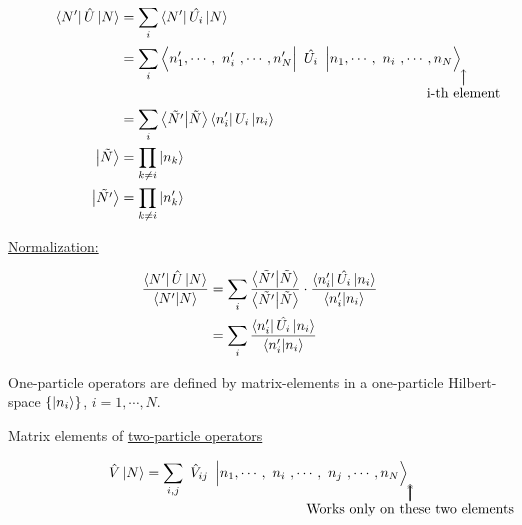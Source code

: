 \begin{align}
	\bra{N'} \hat{U}\ket{N} &= \sum_i  \bra{N'} \hat{U_i}\ket{N} \nonumber \\
	&= \sum_i \bra{n'_1, \cdots, \tikzmark{node1}{n'_i}, \cdots, n'_N}\tikzmark{node2}{\hat{U_i}} \ket{n_1, \cdots, \tikzmark{node3}{n_i},\cdots, n_N} \nonumber
	\begin{tikzpicture}[overlay, remember picture,node distance =1.5cm]
		\draw[->,black] (node2) .. controls +(down:1.2cm) and +(right:0cm) .. node[below] {i-th element} (node3.south);
	\end{tikzpicture}\\
	\nonumber \\
	&= \sum_i \bra{\tilde{N'}}\ket{\tilde{N}} \bra{n'_i} U_i \ket{n_i}\\
	\ket{\tilde{N}} &= \prod_{k \neq i} \ket{n_k} \nonumber \\
	\ket{\tilde{N'}} &= \prod_{k \neq i} \ket{n'_k} \nonumber
\end{align}

\noindent \uline{Normalization:}

\begin{align}
	\frac{\bra{N'} \hat{U} \ket{N}}{\braket{N'}{N}} &= \sum_i \frac{\bra{\tilde{N'}} \ket{\tilde{N}}}{\braket{\tilde{N'}}{\tilde{N}}} \cdot \frac{\bra{n'_i} \hat{U_i} \ket{n_i}}{{\braket{n'_i}{n_i}}} \nonumber \\
	&= \sum_i \frac{\bra{n'_i} \hat{U_i} \ket{n_i}}{\braket{n'_i}{n_i}}
\end{align}


\begin{tcolorbox}
	One-particle operators are defined by matrix-elements in a one-particle Hilbert-space $\{\ket{n_i}\}$, ${i=1,\cdots,N}$.
\end{tcolorbox}

\noindent Matrix elements of \uline{two-particle operators}

\begin{equation}
	\hat{V} \ket{N}= \sum_{i,j} \tikzmark{node1}{\hat{V}_{ij}} \ket{n_1, \cdots , \tikzmark{node2}{n_i}, \cdots, \tikzmark{node3}{n_j}, \cdots, n_N}
	\begin{tikzpicture}[overlay, remember picture,node distance =1.5cm]
		\draw[->,black] (node1) .. controls +(down:1.2cm) and +(right:0cm) .. node[below] {} (node2.south);
		\draw[->,black] (node1) .. controls +(down:1.2cm) and +(right:0cm) .. node[below] {Works only on these two elements} (node3.south);
	\end{tikzpicture}\\
\end{equation}

